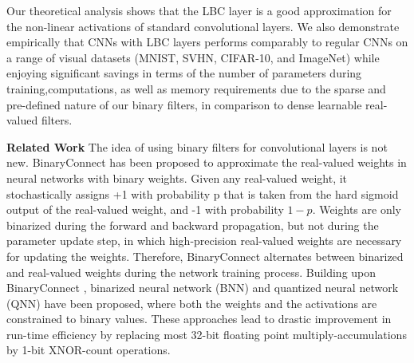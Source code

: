 \documentclass[10pt,twocolumn,a4paper]{article}
\begin{document}
Our theoretical analysis shows that the LBC layer is a good approximation for the non-linear activations of standard convolutional layers. We also demonstrate empirically that CNNs with LBC layers performs comparably to regular CNNs on a range of visual datasets (MNIST, SVHN, CIFAR-10, and ImageNet) while enjoying significant savings in terms of the number of parameters during training,computations, as well as memory requirements due to the sparse and pre-defined nature of our binary filters, in comparison to dense learnable real-valued filters.

\textbf{Related Work}
The idea of using binary filters for convolutional layers is not new. BinaryConnect \cite{courbariaux2015binaryconnect} has been proposed to approximate the real-valued weights in neural networks with binary weights. Given any real-valued weight, it stochastically assigns +1 with probability p that is taken from the hard sigmoid output of the real-valued weight, and -1 with probability $1-p$. Weights are only binarized during the forward and backward propagation, but not during the parameter update step, in which high-precision real-valued weights are necessary for updating the weights. Therefore, BinaryConnect alternates between binarized and real-valued weights during the network training process. Building upon BinaryConnect \cite{courbariaux2015binaryconnect}, binarized neural network (BNN) and quantized neural network (QNN)  have been proposed, where both the weights and the activations are constrained to binary values. These approaches lead to drastic improvement in run-time efficiency by replacing most 32-bit floating point multiply-accumulations by 1-bit XNOR-count operations.
\end{document}
